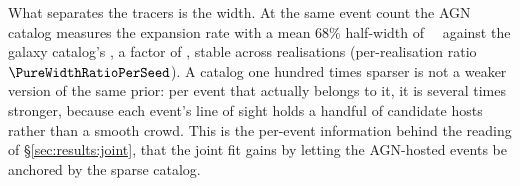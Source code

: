 What separates the tracers is the width. At the same event count the AGN
catalog measures the expansion rate with a mean 68\% half-width of
\PureAgnHalfWidth~\kmsmpc\ against the galaxy catalog's \PureGalHalfWidth,
a factor of \PureWidthRatio, stable across realisations (per-realisation
ratio $\PureWidthRatioPerSeed$). A catalog one hundred times sparser is not a
weaker version of the same prior: per event that actually belongs to it, it
is several times stronger, because each event's line of sight holds a handful
of candidate hosts rather than a smooth crowd. This is the per-event
information behind the reading of \S\ref{sec:results:joint}, that the joint
fit gains by letting the AGN-hosted events be anchored by the sparse
catalog.
